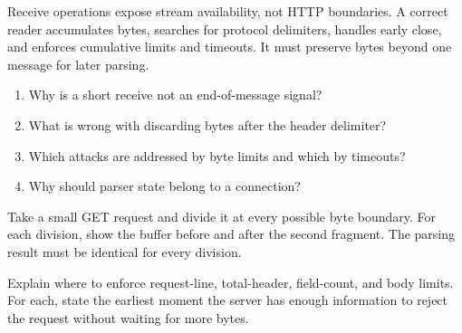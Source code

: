 \summarytitle

Receive operations expose stream availability, not HTTP boundaries. A correct
reader accumulates bytes, searches for protocol delimiters, handles early close,
and enforces cumulative limits and timeouts. It must preserve bytes beyond one
message for later parsing.

\reviewtitle
\begin{enumerate}
  \item Why is a short receive not an end-of-message signal?
  \item What is wrong with discarding bytes after the header delimiter?
  \item Which attacks are addressed by byte limits and which by timeouts?
  \item Why should parser state belong to a connection?
\end{enumerate}

\begin{exercise}
Take a small GET request and divide it at every possible byte boundary. For each
division, show the buffer before and after the second fragment. The parsing
result must be identical for every division.
\end{exercise}

\begin{exercise}
Explain where to enforce request-line, total-header, field-count, and body limits.
For each, state the earliest moment the server has enough information to reject
the request without waiting for more bytes.
\end{exercise}

